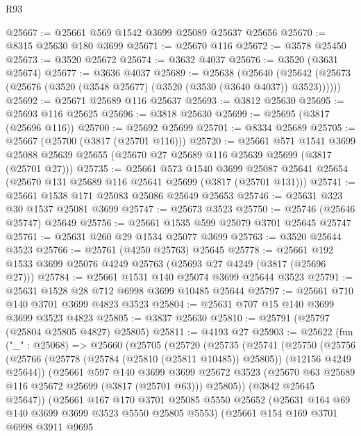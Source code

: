 \begin{lexlean}{R93}
\begin{coremodule}
@25667 := @25661 @569 @1542 @3699 @25089 @25637 @25656
@25670 := @8315 @25630 @180 @3699
@25671 := @25670 @116
@25672 := @3578 @25450
@25673 := @3520 @25672
@25674 := @3632 @4037
@25676 := @3520 (@3631 @25674)
@25677 := @3636 @4037
@25689 := @25638
    (@25640 (@25642 (@25673 (@25676 (@3520 (@3548 @25677) (@3520 (@3530 (@3640 @4037)) @3523))))))
@25692 := @25671 @25689 @116 @25637
@25693 := @3812 @25630
@25695 := @25693 @116 @25625
@25696 := @3818 @25630
@25699 := @25695 (@3817 (@25696 @116))
@25700 := @25692 @25699
@25701 := @8334 @25689
@25705 := @25667 (@25700 (@3817 (@25701 @116)))
@25720 := @25661
    @571
    @1541
    @3699
    @25088
    @25639
    @25655
    (@25670 @27 @25689 @116 @25639 @25699 (@3817 (@25701 @27)))
@25735 := @25661
    @573
    @1540
    @3699
    @25087
    @25641
    @25654
    (@25670 @131 @25689 @116 @25641 @25699 (@3817 (@25701 @131)))
@25741 := @25661 @1538 @171 @25083 @25086 @25649 @25653
@25746 := @25631 @323 @30 @1537 @25081 @3699
@25747 := @25673 @3523
@25750 := @25746 (@25646 @25747) @25649
@25756 := @25661 @1535 @599 @25079 @3701 @25645 @25747
@25761 := @25631 @260 @29 @1534 @25077 @3699
@25763 := @3520 @25644 @3523
@25766 := @25761 (@4250 @25763) @25645
@25778 := @25661 @192 @1533 @3699 @25076 @4249 @25763 (@25693 @27 @4249 (@3817 (@25696 @27)))
@25784 := @25661 @1531 @140 @25074 @3699 @25644 @3523
@25791 := @25631 @1528 @28 @712 @6998 @3699 @10485 @25644
@25797 := @25661 @710 @140 @3701 @3699 @4823 @3523
@25804 := @25631 @707 @15 @140 @3699 @3699 @3523 @4823
@25805 := @3837 @25630
@25810 := @25791 (@25797 (@25804 @25805 @4827) @25805)
@25811 := @4193 @27
@25903 := @25622
    (fun ("_" : @25068) =>
    @25660
      (@25705
        (@25720
          (@25735
            (@25741
              (@25750
                (@25756
                  (@25766 (@25778 (@25784 (@25810 (@25811 @10485)) @25805)) (@12156 @4249 @25644))
                  (@25661
                    @597
                    @140
                    @3699
                    @3699
                    @25672
                    @3523
                    (@25670 @63 @25689 @116 @25672 @25699 (@3817 (@25701 @63)))
                    @25805))
                (@3842 @25645 @25647))
              (@25661
                @167
                @170
                @3701
                @25085
                @5550
                @25652
                (@25631 @164 @69 @140 @3699 @3699 @3523 @5550 @25805 @5553)
                (@25661
                  @154
                  @169
                  @3701
                  @6998
                  @3911
                  @9695

\end{coremodule}
\end{lexlean}
